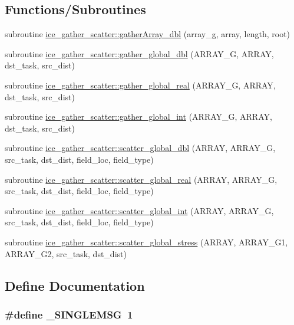 \subsection*{Functions/Subroutines}
\begin{DoxyCompactItemize}
\item 
subroutine \hyperlink{namespaceice__gather__scatter_af2e301c3ae3447184de4cf26a6adae4c}{ice\_\-gather\_\-scatter::gatherArray\_\-dbl} (array\_\-g, array, length, root)
\item 
subroutine \hyperlink{namespaceice__gather__scatter_a21d73cccfa33b7e215f8dbe2af60ea8d}{ice\_\-gather\_\-scatter::gather\_\-global\_\-dbl} (ARRAY\_\-G, ARRAY, dst\_\-task, src\_\-dist)
\item 
subroutine \hyperlink{namespaceice__gather__scatter_a3bfaad5ff40eaa2c23e804f7e75d51f9}{ice\_\-gather\_\-scatter::gather\_\-global\_\-real} (ARRAY\_\-G, ARRAY, dst\_\-task, src\_\-dist)
\item 
subroutine \hyperlink{namespaceice__gather__scatter_a7d152b84c73f88cb892a723d88f54d13}{ice\_\-gather\_\-scatter::gather\_\-global\_\-int} (ARRAY\_\-G, ARRAY, dst\_\-task, src\_\-dist)
\item 
subroutine \hyperlink{namespaceice__gather__scatter_a0cdcbc669124b62ca3daae1382379d53}{ice\_\-gather\_\-scatter::scatter\_\-global\_\-dbl} (ARRAY, ARRAY\_\-G, src\_\-task, dst\_\-dist, field\_\-loc, field\_\-type)
\item 
subroutine \hyperlink{namespaceice__gather__scatter_a55328cf7afed78a137ab75bd786a4d79}{ice\_\-gather\_\-scatter::scatter\_\-global\_\-real} (ARRAY, ARRAY\_\-G, src\_\-task, dst\_\-dist, field\_\-loc, field\_\-type)
\item 
subroutine \hyperlink{namespaceice__gather__scatter_a73a3c6d85b75937079388303c18732cb}{ice\_\-gather\_\-scatter::scatter\_\-global\_\-int} (ARRAY, ARRAY\_\-G, src\_\-task, dst\_\-dist, field\_\-loc, field\_\-type)
\item 
subroutine \hyperlink{namespaceice__gather__scatter_a484f45410ad7c18c07379d8bd0400caf}{ice\_\-gather\_\-scatter::scatter\_\-global\_\-stress} (ARRAY, ARRAY\_\-G1, ARRAY\_\-G2, src\_\-task, dst\_\-dist)
\end{DoxyCompactItemize}


\subsection{Define Documentation}
\hypertarget{ice__gather__scatter_8F90_a1f575c320f2236b7ff09f848037bf839}{
\subsubsection[{\_\-SINGLEMSG}]{\setlength{\rightskip}{0pt plus 5cm}\#define \_\-SINGLEMSG~1}}
\label{ice__gather__scatter_8F90_a1f575c320f2236b7ff09f848037bf839}
